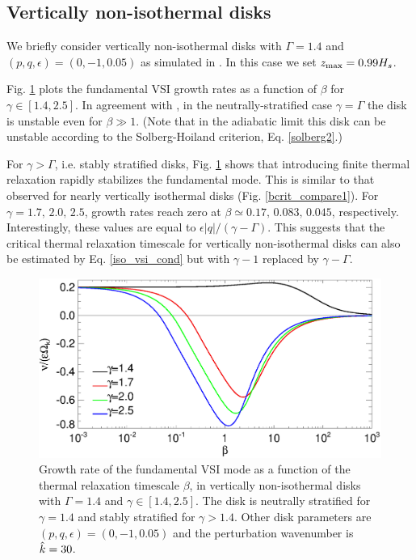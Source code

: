 \subsection{Vertically non-isothermal disks} 
We briefly consider vertically non-isothermal disks with 
$\Gamma=1.4$ and $(p,q,\epsilon)=(0,-1,0.05)$ as simulated in
\cite{nelson13}. In this case we set $z_\mathrm{max}=0.99H_s$.  

Fig. \ref{gcorr_compare_vnoniso} plots the fundamental VSI growth
rates as a function of $\beta$ for $\gamma\in[1.4,2.5]$. In agreement
with \citeauthor{nelson13}, in  
the neutrally-stratified case $\gamma=\Gamma$ the disk is unstable 
even for $\beta\gg 1$. (Note that in the adiabatic limit 
this disk can be unstable according to the
Solberg-Hoiland criterion, Eq. \ref{solberg2}.) 

For $\gamma>\Gamma$, i.e. stably stratified disks,
Fig. \ref{gcorr_compare_vnoniso} shows that introducing finite thermal
relaxation rapidly stabilizes the fundamental mode. This is
similar to that observed for nearly vertically isothermal disks
(Fig. \ref{bcrit_compare1}). For $\gamma=1.7,\,2.0,\,2.5$, growth
rates reach zero at  $\beta\simeq0.17,\,0.083,\,0.045$, respectively.
Interestingly, these values are equal to
$\epsilon|q|/(\gamma-\Gamma)$. This suggests that the critical thermal
relaxation timescale for vertically non-isothermal disks can also be
estimated by Eq. \ref{iso_vsi_cond} but with $\gamma-1$ replaced by
$\gamma-\Gamma$. 

\begin{figure}
  \includegraphics[width=\linewidth,clip=true,trim=0cm 0cm 0cm
  0cm]{figures/gcorr_compare_vnoniso2}
  \caption{Growth rate of the fundamental VSI mode as a function of
    the thermal relaxation timescale $\beta$, in vertically
    non-isothermal disks with $\Gamma=1.4$ and
    $\gamma\in[1.4,2.5]$. The disk is neutrally
    stratified for $\gamma=1.4$ and stably stratified for
    $\gamma>1.4$. Other disk parameters are
    $(p,q,\epsilon)=(0,-1,0.05)$ and the perturbation wavenumber is
    $\hat{k}=30$.  
    \label{gcorr_compare_vnoniso}}
\end{figure}













